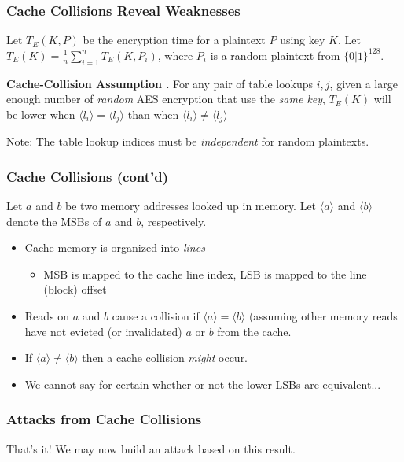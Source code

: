 \documentclass[9pt,handout]{beamer}
\begin{document}
\begin{frame}
	\frametitle{Cache Collisions Reveal Weaknesses}
	Let $T_E(K, P)$ be the encryption time for a plaintext $P$ using key $K$. 
	Let $\bar{T}_E(K) = \frac{1}{n}\sum_{i = 1}^{n}T_E(K, P_i)$, where $P_i$ is a random plaintext from $\{0|1\}^{128}$.

	\bigskip

	\textbf{Cache-Collision Assumption \cite{bonneau}}. For any pair of table lookups $i, j$, given
a large enough number of \emph{random} AES encryption that use the \emph{same key}, $\bar{T}_E(K)$ will
be lower when $\langle l_i \rangle = \langle l_j \rangle$ than when $\langle l_i \rangle \not= \langle l_j \rangle$

	\bigskip
	
	Note: The table lookup indices must be \emph{independent} for random plaintexts.
\end{frame}

\begin{frame}
	\frametitle{Cache Collisions (cont'd)}
	Let $a$ and $b$ be two memory addresses looked up in memory. Let $\langle a \rangle$ and $\langle b \rangle$ 
	denote the MSBs of $a$ and $b$, respectively. 
	\begin{itemize}
		\item Cache memory is organized into \emph{lines}
		\begin{itemize}
			\item MSB is mapped to the cache line index, LSB is mapped to the line (block) offset
		\end{itemize}
		\item Reads on $a$ and $b$ cause a collision if $\langle a \rangle = \langle b \rangle$ (assuming other memory reads
		have not evicted (or invalidated) $a$ or $b$ from the cache. 
		\item If $\langle a \rangle \not= \langle b \rangle$ then a cache collision \emph{might} occur.
		\item We cannot say for certain whether or not the lower LSBs are equivalent...
	\end{itemize}
\end{frame}

\begin{frame}
	\frametitle{Attacks from Cache Collisions}
	\begin{center}
	That's it! We may now build an attack based on this result.
	\end{center}
\end{frame}
\end{document}
